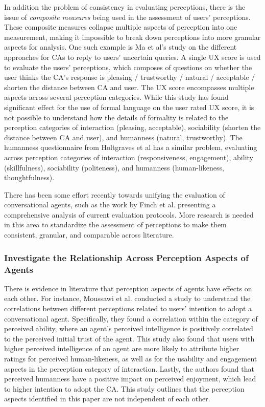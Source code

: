 In addition the problem of consistency in evaluating perceptions, there is the issue of  \textit{composite measures} being used in the assessment of users' perceptions. These composite measures collapse multiple aspects of perception into one measurement, making it impossible to break down perceptions into more granular aspects for analysis. One such example is Ma et al's study \cite{ma2022ask}\cmt{[29]} on the different approaches for CAs to reply to users' uncertain queries. A single UX score is used to evaluate the users' perceptions, which composes of questions on whether the user thinks the CA's response is pleasing / trustworthy / natural / acceptable / shorten the distance between CA and user. The UX score encompasses multiple aspects across several perception categories. While this study has found significant effect for the use of formal language on the user rated UX score, it is not possible to understand how the details of formality is related to the perception categories of interaction (pleasing, acceptable), sociability (shorten the distance between CA and user), and humanness (natural, trustworthy). The humanness questionnaire from Holtgraves et al \cite{holtgraves2007perceiving} has a similar problem, evaluating across perception categories of interaction (responsiveness, engagement), ability (skillfulness), sociability (politeness), and humanness (human-likeness, thoughtfulness).

There has been some effort recently towards unifying the evaluation of conversational agents, such as the work by Finch et al. \cite{finch2020towards} presenting a comprehensive analysis of current evaluation protocols. More research is needed in this area to standardize the assessment of perceptions to make them consistent, granular, and comparable across literature.

\subsubsection{Investigate the Relationship Across Perception Aspects of Agents}

There is evidence in literature that perception aspects of agents have effects on each other. For instance, Moussawi et al. \cite{moussawi2021perceptions}\cmt{[36]} conducted a study to understand the correlations between different perceptions related to users' intention to adopt a conversational agent. Specifically, they found a correlation within the category of perceived ability, where an agent's perceived intelligence is positively correlated to the perceived initial trust of the agent. This study also found that users with higher perceived intelligence of an agent are more likely to attribute higher ratings for perceived human-likeness, as well as for the usability and engagement aspects in the perception category of interaction. Lastly, the authors found that perceived humanness have a positive impact on perceived enjoyment, which lead to higher intention to adopt the CA. This study outlines that the perception aspects identified in this paper are not independent of each other.

